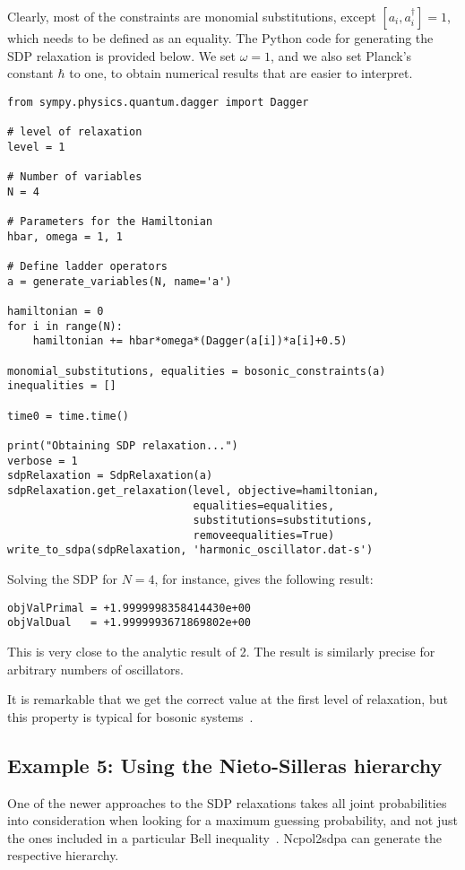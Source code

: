 \documentclass{article}
\begin{document}
Clearly, most of the constraints are monomial substitutions, except $[a_{i},a_{i}^{\dagger}]=1$, which needs to be defined as an equality. The Python code for generating the SDP relaxation is provided below. We set $\omega=1$, and we also set Planck's constant $\hbar$ to one, to obtain numerical results that are easier to interpret.
\begin{verbatim}
from sympy.physics.quantum.dagger import Dagger

# level of relaxation
level = 1

# Number of variables
N = 4

# Parameters for the Hamiltonian
hbar, omega = 1, 1

# Define ladder operators
a = generate_variables(N, name='a')

hamiltonian = 0
for i in range(N):
    hamiltonian += hbar*omega*(Dagger(a[i])*a[i]+0.5)

monomial_substitutions, equalities = bosonic_constraints(a)
inequalities = []

time0 = time.time()

print("Obtaining SDP relaxation...")
verbose = 1
sdpRelaxation = SdpRelaxation(a)
sdpRelaxation.get_relaxation(level, objective=hamiltonian,
                             equalities=equalities,
                             substitutions=substitutions,
                             removeequalities=True)
write_to_sdpa(sdpRelaxation, 'harmonic_oscillator.dat-s')                      
\end{verbatim}

Solving the SDP for $N=4$, for instance, gives the following result:
\begin{verbatim}
objValPrimal = +1.9999998358414430e+00
objValDual   = +1.9999993671869802e+00
\end{verbatim}
This is very close to the analytic result of 2. The result is similarly precise for arbitrary numbers of oscillators. 

It is remarkable that we get the correct value at the first level of relaxation, but this property is typical for bosonic systems~\citep{navascues2013paradox}.

\subsection{Example 5: Using the Nieto-Silleras hierarchy}
One of the newer approaches to the SDP relaxations takes all joint probabilities into consideration when looking for a maximum guessing probability, and not just the ones included in a particular Bell inequality~\citep{nieto-silleras2014using,bancal2014more}. Ncpol2sdpa can generate the respective hierarchy.
\end{document}
